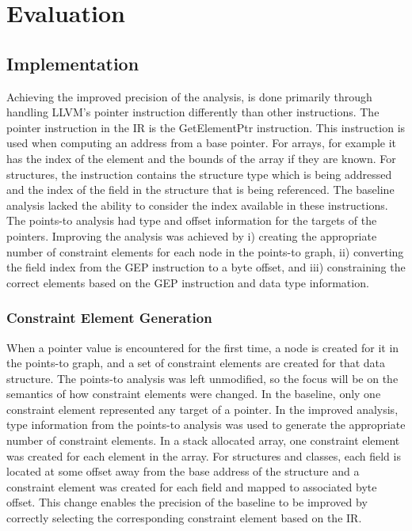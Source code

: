 \documentclass[11pt,a4paper]{article}
\begin{document}
\section{Evaluation}
\subsection{Implementation}

Achieving the improved precision of the analysis, is done primarily through
handling LLVM's pointer instruction differently than other instructions. The
pointer instruction in the IR is the GetElementPtr instruction. This instruction
is used when computing an address from a base pointer. For arrays, for example
it has the index of the element and the bounds of the array if they are known.
For structures, the instruction contains the structure type which is being
addressed and the index of the field in the structure that is being referenced.
The baseline analysis lacked the ability to consider the index available in
these instructions. The points-to analysis had type and offset
information for the targets of the pointers. Improving the analysis was achieved
by i) creating the appropriate number of constraint elements for each node in
the points-to graph, ii) converting the field index from the GEP instruction to
a byte offset, and iii) constraining the correct elements based on
the GEP instruction and data type information.

\subsubsection{Constraint Element Generation}
When a pointer value is encountered for the first time, a node is created for it
in the points-to graph, and a set of constraint elements are created for that
data structure. The points-to analysis was left unmodified, so the focus will be
on the semantics of how constraint elements were changed. In the baseline, only
one constraint element represented any target of a pointer. In the improved
analysis, type information from the points-to analysis was used to generate the
appropriate number of constraint elements. In a stack allocated array, one
constraint element was created for each element in the array. For structures and
classes, each field is located at some offset away from the base address of the
structure and a constraint element was created for each field and mapped to
associated byte offset. This change enables the precision of the baseline to be
improved by correctly selecting the corresponding constraint element based on
the IR.
\end{document}
